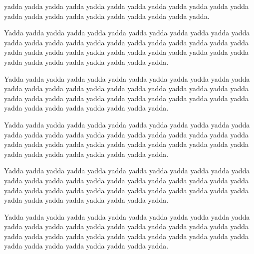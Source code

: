 \begin{multicols}{2}
yadda yadda yadda yadda yadda yadda yadda yadda yadda yadda yadda
yadda yadda yadda yadda yadda yadda yadda yadda yadda yadda yadda.\mktsShowpar\par
Yadda yadda yadda yadda yadda yadda yadda yadda yadda yadda yadda
yadda yadda yadda yadda yadda yadda yadda yadda yadda yadda yadda
yadda yadda yadda yadda yadda yadda yadda yadda yadda yadda yadda
yadda yadda yadda yadda yadda yadda yadda yadda yadda yadda yadda.\mktsShowpar\par
Yadda yadda yadda yadda yadda yadda yadda yadda yadda yadda yadda
yadda yadda yadda yadda yadda yadda yadda yadda yadda yadda yadda
yadda yadda yadda yadda yadda yadda yadda yadda yadda yadda yadda
yadda yadda yadda yadda yadda yadda yadda yadda yadda yadda yadda.\mktsShowpar\par
Yadda yadda yadda yadda yadda yadda yadda yadda yadda yadda yadda
yadda yadda yadda yadda yadda yadda yadda yadda yadda yadda yadda
yadda yadda yadda yadda yadda yadda yadda yadda yadda yadda yadda
yadda yadda yadda yadda yadda yadda yadda yadda yadda yadda yadda.\mktsShowpar\par
Yadda yadda yadda yadda yadda yadda yadda yadda yadda yadda yadda
yadda yadda yadda yadda yadda yadda yadda yadda yadda yadda yadda
yadda yadda yadda yadda yadda yadda yadda yadda yadda yadda yadda
yadda yadda yadda yadda yadda yadda yadda yadda yadda yadda yadda.\mktsShowpar\par
Yadda yadda yadda yadda yadda yadda yadda yadda yadda yadda yadda
yadda yadda yadda yadda yadda yadda yadda yadda yadda yadda yadda
yadda yadda yadda yadda yadda yadda yadda yadda yadda yadda yadda
yadda yadda yadda yadda yadda yadda yadda yadda yadda yadda yadda.\mktsShowpar\par
\end{multicols}
